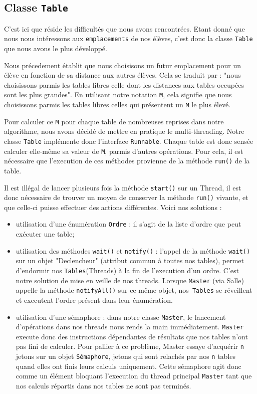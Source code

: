 \documentclass[11pt,a4paper, openany]{book}
\begin{document}
\subsection{Classe \texttt{Table}}
C'est ici que réside les difficultés que nous avons rencontrées. Etant donné que nous nous intéressons aux \texttt{emplacements} de nos élèves, c'est donc la classe \texttt{Table} que nous avons le plus développé.

Nous précedement établit que nous choisisons un futur emplacement pour un élève en fonction de sa distance aux autres élèves.
Cela se traduit par : "nous choisissons parmis les tables libres celle dont les distances aux tables occupées sont les plus grandes". En utilisant notre notation \texttt{M}, cela signifie que nous choisissons parmis les tables libres celles qui présentent un \texttt{M} le plus élevé.

Pour calculer ce \texttt{M} pour chaque table de nombreuses reprises dans notre algorithme, nous avons décidé de mettre en pratique le multi-threading.
Notre classe \texttt{Table} implémente donc l'interface \texttt{Runnable}. Chaque table est donc sensée calculer elle-même sa valeur de \texttt{M}, parmis d'autres opérations. Pour cela, il est nécessaire que l'execution de ces méthodes provienne de la méthode \texttt{run()} de la table. 

Il est illégal de lancer plusieurs fois la méthode \texttt{start()} sur un Thread, il est donc nécessaire de trouver un moyen de conserver la méthode \texttt{run()} vivante, et que celle-ci puisse effectuer des actions différentes. Voici nos solutions : 
\begin{itemize}
\item utilisation d'une énumération \texttt{Ordre} : il s'agit de la liste d'ordre que peut exécuter une table;
\item utilisation des méthodes \texttt{wait()} et \texttt{notify()} : l'appel de la méthode \texttt{wait()} sur un objet "Declencheur" (attribut commun à toutes nos tables), permet d'endormir nos \texttt{Tables}(Threads) à la fin de l'execution d'un ordre. C'est notre solution de mise en veille de nos threads. Lorsque \texttt{Master} (via Salle) appelle la méthode \texttt{notifyAll()} sur ce même objet, nos\texttt{ Tables} se réveillent et executent l'ordre présent dans leur énumération.
\item utilisation d'une sémaphore : dans notre classe \texttt{Master}, le lancement d'opérations dans nos threads nous rends la main immédiatement. \texttt{Master} execute donc des instructions dépendantes de résultats que nos tables n'ont pas fini de calculer. Pour pallier à ce problème, Master essaye d'acquérir \texttt{n} jetons sur un objet \texttt{Sémaphore}, jetons qui sont relachés par nos \texttt{n} tables quand elles ont finis leurs calculs uniquement.
Cette sémaphore agit donc comme un élément bloquant l'execution du thread principal \texttt{Master} tant que nos calculs répartis dans nos tables ne sont pas terminés.
\end{itemize}
\end{document}
